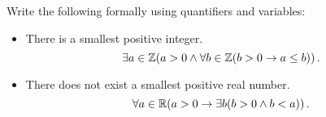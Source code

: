 \guard




\begin{exmp}
\label{exmp:smallestIntegerAnReal}
  Write the following formally using quantifiers and variables:
  \begin{itemize}
    \item There is a smallest positive integer.\\
      \[ \exists a\in\mathbb{Z}(a>0\wedge\forall b\in\mathbb{Z}(b>0\rightarrow a\leq b))\,.\]
    \item There does not exist a smallest positive real number.\\
      \[ \forall a\in\mathbb{R}( a>0\rightarrow\exists b(b>0\wedge b<a))\,.\]
  \end{itemize}

\end{exmp}

